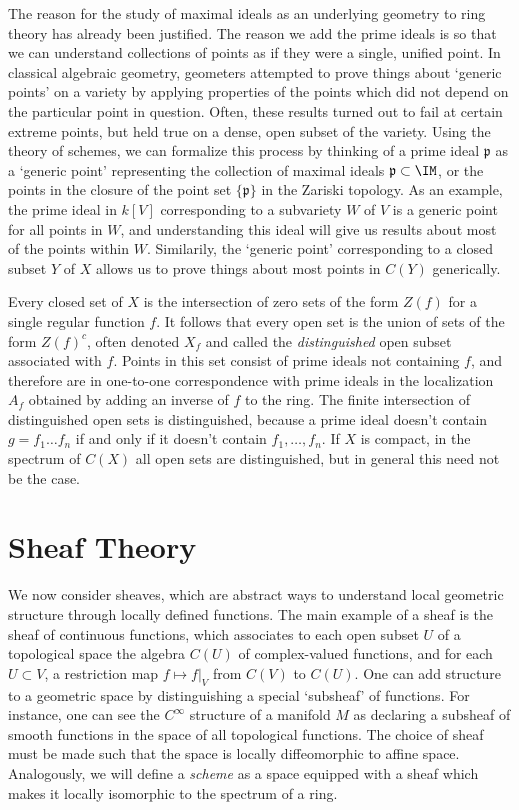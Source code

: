 The reason for the study of maximal ideals as an underlying geometry to ring theory has already been justified. The reason we add the prime ideals is so that we can understand collections of points as if they were a single, unified point. In classical algebraic geometry, geometers attempted to prove things about `generic points' on a variety by applying properties of the points which did not depend on the particular point in question. Often, these results turned out to fail at certain extreme points, but held true on a dense, open subset of the variety. Using the theory of schemes, we can formalize this process by thinking of a prime ideal $\mathfrak{p}$ as a `generic point' representing the collection of maximal ideals $\mathfrak{p} \subset \IM$, or the points in the closure of the point set $\{ \mathfrak{p} \}$ in the Zariski topology. As an example, the prime ideal in $k[V]$ corresponding to a subvariety $W$ of $V$ is a generic point for all points in $W$, and understanding this ideal will give us results about most of the points within $W$. Similarily, the `generic point' corresponding to a closed subset $Y$ of $X$ allows us to prove things about most points in $C(Y)$ generically.

Every closed set of $X$ is the intersection of zero sets of the form $Z(f)$ for a single regular function $f$. It follows that every open set is the union of sets of the form $Z(f)^c$, often denoted $X_f$ and called the \emph{distinguished} open subset associated with $f$. Points in this set consist of prime ideals not containing $f$, and therefore are in one-to-one correspondence with prime ideals in the localization $A_f$ obtained by adding an inverse of $f$ to the ring. The finite intersection of distinguished open sets is distinguished, because a prime ideal doesn't contain $g = f_1 \dots f_n$ if and only if it doesn't contain $f_1, \dots, f_n$. If $X$ is compact, in the spectrum of $C(X)$ all open sets are distinguished, but in general this need not be the case.

\section{Sheaf Theory}

We now consider sheaves, which are abstract ways to understand local geometric structure through locally defined functions. The main example of a sheaf is the sheaf of continuous functions, which associates to each open subset $U$ of a topological space the algebra $C(U)$ of complex-valued functions, and for each $U \subset V$, a restriction map $f \mapsto f|_V$ from $C(V)$ to $C(U)$. One can add structure to a geometric space by distinguishing a special `subsheaf' of functions. For instance, one can see the $C^\infty$ structure of a manifold $M$ as declaring a subsheaf of smooth functions in the space of all topological functions. The choice of sheaf must be made such that the space is locally diffeomorphic to affine space. Analogously, we will define a {\it scheme} as a space equipped with a sheaf which makes it locally isomorphic to the spectrum of a ring.

